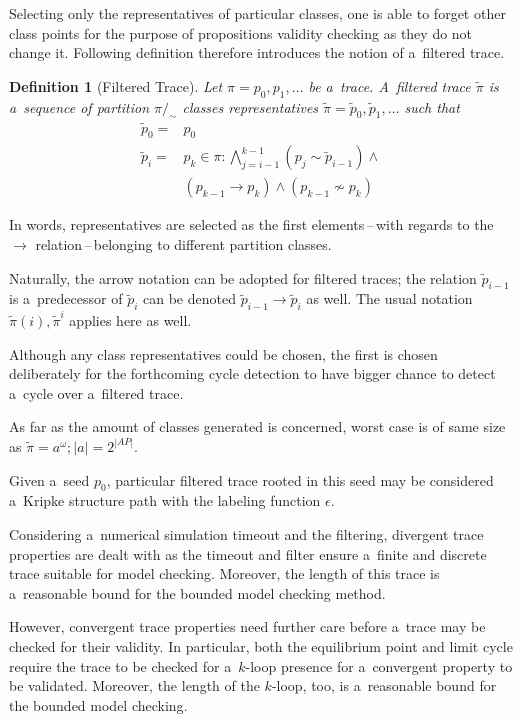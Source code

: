 \documentclass[12pt,twoside,draft]{fithesis}
\newtheorem{mydef}{Definition}
\begin{document}
Selecting only the representatives of particular classes, one is able to
forget other class points for the purpose of propositions validity
checking as they do not change it. Following definition therefore
introduces the notion of a~filtered trace.
\begin{mydef}[Filtered Trace] Let $\pi=p_0,p_1,\dotsc$ be a~trace.
A~filtered trace $\tilde{\pi}$ is a~sequence of partition
$\pi/_{\sim}$ classes representatives
$\tilde{\pi}=\tilde{p}_0,\tilde{p}_1,\dotsc$ such that
\begin{align}
\tilde{p}_{0}=&p_0\\
\tilde{p}_{i}=&p_k\in\pi:\bigwedge_{j=i-1}^{k-1}\left(
	p_j\sim \tilde{p}_{i-1}\right)
	\wedge\nonumber\\
	&(p_{k-1}\rightarrow p_{k})\wedge(p_{k-1}\not\sim p_{k})
\end{align}
\end{mydef}
In words, representatives are selected as the first elements\,--\,with
regards to the $\rightarrow$ relation\,--\,belonging to different
partition classes. 

Naturally, the arrow notation can be adopted for filtered traces;
the relation $\tilde{p}_{i-1}$ is a~predecessor of $\tilde{p}_{i}$ can
be denoted $\tilde{p}_{i-1}\rightarrow\tilde{p}_{i}$ as well. The usual
notation $\tilde{\pi}(i),\tilde{\pi}^i$ applies here as well.

Although any class representatives could be chosen, the first is chosen
deliberately for the forthcoming cycle detection to have bigger chance
to detect a~cycle over a~filtered trace.

As far as the amount of classes generated is concerned, worst case is
of same size as $\tilde{\pi}=a^\omega; |a|=2^{|AP|}$.

Given a~seed $p_0$, particular filtered trace rooted in this seed may be
considered a~Kripke structure path with the labeling function
$\epsilon$.

Considering a~numerical simulation timeout and the filtering,
divergent trace properties are dealt with as the timeout and filter
ensure a~finite and discrete trace suitable for model checking. Moreover,
the length of this trace is a~reasonable bound for the bounded model
checking method\cite{biere}.

However, convergent trace properties need further care before a~trace
may be checked for their validity. In particular, both the equilibrium
point and limit cycle require the trace to be checked for a~$k$-loop
presence for a~convergent property to be validated. Moreover, the length
of the $k$-loop, too, is a~reasonable bound for the bounded model
checking\cite{biere}.
\end{document}
